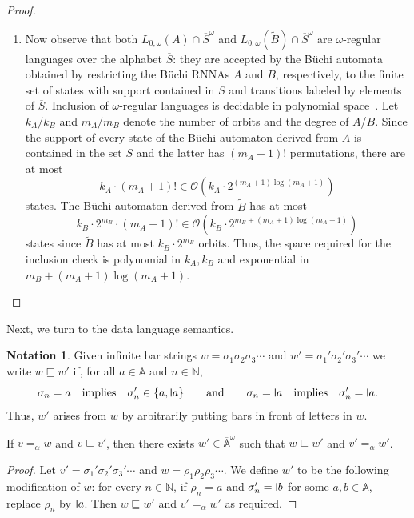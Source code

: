 \documentclass[10pt,a4paper]{amsart}
\newcommand{\midmid}{\hspace{0.2ex}{\rule[-0.1ex]{0.6pt}{1.65ex}}\hspace{0.2ex}}
\newcommand{\newletter}[1]{{\midmid}#1}
\newcommand{\barA}{\overline{\names}}
\numberwithin{equation}{section}
\newcommand{\CO}{\mathcal{O}}
\newcommand{\ol}{\overline}
\newcommand{\tl}{\widetilde}
\newcommand{\Nat}{{\mathbb{N}}}
\newcommand{\+}[1]{\mathcal{#1}\xspace}
\newcommand{\names}{\mathbb{A}}
\theoremstyle{definition}
\newtheorem{nota}[theorem]{Notation}
\begin{document}
\begin{proof}
\begin{enumerate}
  \item Now observe that both $L_{0,\omega}(A)\cap \ol{S}^\omega$ and
    $L_{0,\omega}(\tl{B})\cap \ol{S}^\omega$ are $\omega$-regular
    languages over the alphabet $\ol{S}$: they are accepted by the
    Büchi automata obtained by restricting the Büchi RNNAs $A$ and
    $B$, respectively, to the finite set of states with support
    contained in $S$ and transitions labeled by elements of
    $\ol{S}$. Inclusion of $\omega$-regular languages is decidable in
    polynomial space~\cite{kv96}. Let $k_A/k_B$ and $m_A/m_B$ denote
    the number of orbits and the degree of $A$/$B$. Since the support
    of every state of the Büchi automaton derived from $A$ is contained in
    the set $S$ and the latter has $(m_A+1)!$ permutations, there are at most
    \[
      k_A\cdot (m_A+1)!
      \in 
      \CO(k_A\cdot 2^{(m_A+1)\log (m_A+1)})
    \]
    states.
    The Büchi automaton derived from $\tl{B}$ has at most
    \[
      k_B\cdot 2^{m_B}\cdot (m_A+1)!
      \in
      \CO(k_B\cdot 2^{m_B + (m_A+1)\log (m_A+1)})
    \]
    states 
    since $\tl{B}$ has at most $k_B\cdot 2^{m_B}$ orbits. Thus, the
    space required for the inclusion check is polynomial in $k_A, k_B$
    and exponential in $m_B+(m_A+1)\log (m_A+1)$.\qedhere
  \end{enumerate}
\end{proof}

\noindent Next, we turn to the data language semantics. 
%
\begin{nota}
  Given infinite bar strings $w=\sigma_1\sigma_2\sigma_3\cdots$ and
  $w'=\sigma_1'\sigma_2'\sigma_3'\cdots$ we write $w\sqsubseteq w'$ if,
  for all $a\in \names$ and $n\in \Nat$,
  \[ \sigma_n=a
    \quad\text{implies}\quad
    \sigma_n'\in \{a,\newletter a\}
    \qquad\text{and}\qquad
    \sigma_n=\newletter a
    \quad\text{implies}\quad
    \sigma_n'=\newletter a.
  \]
  Thus, $w'$ arises from $w$ by arbitrarily putting bars in front of letters in $w$.
\end{nota}
%
\begin{lemma}\label{lem:order-rel}
  If $v=_\alpha w$ and $v\sqsubseteq v'$, then there exists
  $w'\in \barA^\omega$ such that $w\sqsubseteq w'$ and $v'=_\alpha w'$.
\end{lemma}
%
\begin{proof}
  Let $v'=\sigma_1'\sigma_2'\sigma_3'\cdots$ and
  $w=\rho_1\rho_2\rho_3\cdots$.  We define $w'$ to be the following
  modification of $w$: for every $n\in \Nat$, if $\rho_n=a$ and
  $\sigma_n'=\newletter b$ for some $a,b\in \names$, replace $\rho_n$
  by $\newletter a$. Then $w\sqsubseteq w'$ and $v'=_\alpha w'$ as
  required.
\end{proof}
\end{document}
